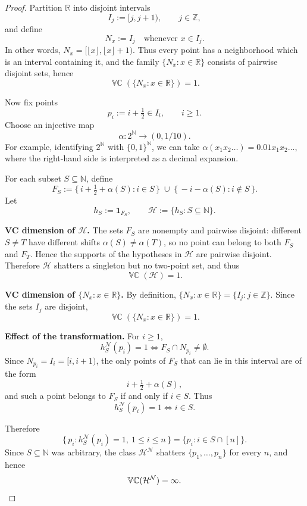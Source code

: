 \documentclass[11pt]{article}
\theoremstyle{plain}
\theoremstyle{definition}
\theoremstyle{remark}
\DeclareMathOperator{\VCdim}{\mathbb{VC}}
\begin{document}
\begin{proof}
Partition \(\mathbb R\) into disjoint intervals
\[
I_j:=[j,j+1), \qquad j\in\mathbb Z,
\]
and define
\[
N_x:=I_j \quad \text{whenever } x\in I_j.
\]
In other words, $N_x = [\lfloor x \rfloor, \lfloor x \rfloor + 1)$.
Thus every point has a neighborhood which is an interval containing it,
and the family \(\{N_x:x\in\mathbb R\}\) consists of pairwise disjoint
sets, hence
\[
\VCdim(\{N_x:x\in\mathbb R\})=1.
\]

Now fix points
\[
p_i:=i+\tfrac12 \in I_i, \qquad i\ge 1.
\]
Choose an injective map
\[
\alpha\colon 2^{\mathbb N}\to (0,1/10).
\]
For example, identifying $2^{\mathbb N}$ with $\{0,1\}^{\mathbb N}$, we can take $\alpha(x_1x_2\ldots) = 0.01x_1x_2\ldots$, where the right-hand side is interpreted as a decimal expansion.

For each subset \(S\subseteq\mathbb N\), define
\[
F_S
:=
\{\, i+\tfrac12 + \alpha(S) : i\in S \,\}
\;\cup\;
\{\, -i-\alpha(S) : i\notin S \,\}.
\]
Let
\[
h_S:=\mathbf 1_{F_S},
\qquad
\mathcal H:=\{h_S:S\subseteq\mathbb N\}.
\]

\medskip
\textbf{VC dimension of \(\mathcal H\).}
The sets \(F_S\) are nonempty and pairwise disjoint: different \(S\neq T\)
have different shifts \(\alpha(S)\neq\alpha(T)\), so no point can belong to
both \(F_S\) and \(F_T\). Hence the supports of the hypotheses in
\(\mathcal H\) are pairwise disjoint. Therefore \(\mathcal H\) shatters a
singleton but no two-point set, and thus
\[
\VCdim(\mathcal H)=1.
\]

\medskip
\textbf{VC dimension of \(\{N_x : x \in \mathbb R\}\).}
By definition, \(\{N_x : x \in \mathbb R\} = \{I_j : j \in \mathbb Z\}\). Since the sets $I_j$ are disjoint,
\[
\VCdim(\{N_x : x \in \mathbb R\}) = 1.
\]

\medskip
\textbf{Effect of the transformation.}
For \(i\ge1\),
\[
h_S^{\mathcal N}(p_i)=1
\iff
F_S\cap N_{p_i}\neq\emptyset.
\]
Since \(N_{p_i}=I_i=[i,i+1)\), the only points of \(F_S\) that can lie in
this interval are of the form
\[
i+\tfrac12+\alpha(S),
\]
and such a point belongs to \(F_S\) if and only if \(i\in S\). Thus
\[
h_S^{\mathcal N}(p_i)=1
\iff
i\in S.
\]

Therefore
\[
\{\,p_i:h_S^{\mathcal N}(p_i)=1,\ 1\le i\le n\,\}
=
\{p_i:i\in S\cap[n]\}.
\]
Since \(S\subseteq\mathbb N\) was arbitrary, the class \(\mathcal H^{\mathcal N}\)
shatters \(\{p_1,\dots,p_n\}\) for every \(n\), and hence
\[
\VCdim(\mathcal H^{\mathcal N})=\infty. \qedhere
\]
\end{proof}
\end{document}
